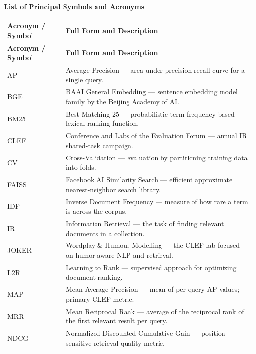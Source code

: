 \thispagestyle{plain}
\begin{center}
    \Large \textbf{List of Principal Symbols and Acronyms}
\end{center}

\vspace{1em}

\begin{longtable}{|p{2.8cm}|p{10.5cm}|}
\hline
\textbf{Acronym / Symbol} & \textbf{Full Form and Description} \\
\hline
\endfirsthead
\hline
\textbf{Acronym / Symbol} & \textbf{Full Form and Description} \\
\hline
\endhead
\hline
\endfoot

AP         & Average Precision --- area under precision-recall curve for a single query. \\\hline
BGE        & BAAI General Embedding --- sentence embedding model family by the Beijing Academy of AI. \\\hline
BM25       & Best Matching 25 --- probabilistic term-frequency based lexical ranking function. \\\hline
CLEF       & Conference and Labs of the Evaluation Forum --- annual IR shared-task campaign. \\\hline
CV         & Cross-Validation --- evaluation by partitioning training data into folds. \\\hline
FAISS      & Facebook AI Similarity Search --- efficient approximate nearest-neighbor search library. \\\hline
IDF        & Inverse Document Frequency --- measure of how rare a term is across the corpus. \\\hline
IR         & Information Retrieval --- the task of finding relevant documents in a collection. \\\hline
JOKER      & Wordplay \& Humour Modelling --- the CLEF lab focused on humor-aware NLP and retrieval. \\\hline
L2R        & Learning to Rank --- supervised approach for optimizing document ranking. \\\hline
MAP        & Mean Average Precision --- mean of per-query AP values; primary CLEF metric. \\\hline
MRR        & Mean Reciprocal Rank --- average of the reciprocal rank of the first relevant result per query. \\\hline
NDCG       & Normalized Discounted Cumulative Gain --- position-sensitive retrieval quality metric. \\\hline

\end{longtable}
